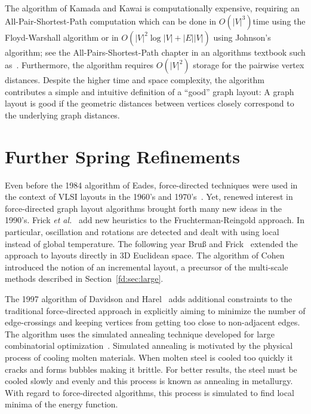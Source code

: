 \documentclass[notitlepage,letter,11pt]{article}
\begin{document}
The algorithm of Kamada and Kawai is computationally expensive,
requiring an All-Pair-Shortest-Path computation which can be done in
$O(|V|^3)$time using the Floyd-Warshall algorithm or in $O(|V|^2 \log
|V| +|E||V|)$ using Johnson's algorithm;
see the All-Pairs-Shortest-Path chapter
in an algorithms textbook such as~\cite{clrs-ia-90}. Furthermore, the
algorithm requires $O(|V|^2)$ storage for the pairwise vertex
distances. Despite the higher time and space complexity, the algorithm
contributes a simple and intuitive definition of a ``good'' graph
layout: A graph layout is good if the geometric distances between
vertices closely correspond to the underlying graph distances.






\section{Further Spring Refinements}
\label{fd:sec:ar} 

Even before the 1984 algorithm of Eades, force-directed techniques
were used in the context of VLSI layouts in the 1960's and
1970's~\cite{fcw-accel-67,qb-fdcpp-79}. Yet, renewed interest in
force-directed graph layout algorithms brought forth many new ideas in
the 1990's. Frick {\em et al.}~\cite{flm-falau-95} add new
heuristics to the Fruchterman-Reingold approach. In particular,
oscillation and rotations are detected and dealt with using local
instead of global temperature. The following year Bru{\ss} and
Frick~\cite{bf-fi3dg-96} extended the approach to layouts directly in
3D Euclidean space. The algorithm of Cohen~\cite{ACMTOCHI::Cohen1997}
introduced the notion of an incremental layout, a precursor of the
multi-scale methods described in Section~\ref{fd:sec:large}.

The 1997 algorithm of Davidson and Harel~\cite{dh-dgnus-96} adds
additional constraints to the traditional force-directed approach in
explicitly aiming to minimize the number of edge-crossings and keeping
vertices from getting too close to non-adjacent edges. The algorithm
uses the simulated annealing technique developed for large
combinatorial optimization~\cite{kirkpatrick83optimization}. Simulated
annealing is motivated by the physical process of cooling molten
materials. When molten steel is cooled too quickly it cracks and forms
bubbles making it brittle. For better results, the steel must be
cooled slowly and evenly and this process is known as annealing in
metallurgy. With regard to force-directed algorithms, this process is
simulated to find local minima of the energy function. 
\end{document}
